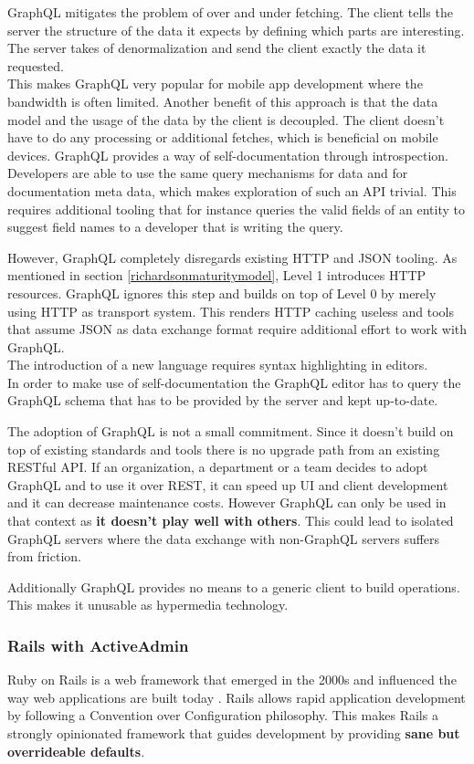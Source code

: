 GraphQL mitigates the problem of over and under fetching. The client tells the server the structure of the data it expects by defining which parts are interesting. The server takes of denormalization and send the client exactly the data it requested. \\ This makes GraphQL very popular for mobile app development where the bandwidth is often limited. Another benefit of this approach is that the data model and the usage of the data by the client is decoupled. The client doesn't have to do any processing or additional fetches, which is beneficial on mobile devices.
GraphQL provides a way of self-documentation through introspection. Developers are able to use the same query mechanisms for data and for documentation meta data, which makes exploration of such an API trivial. This requires additional tooling that for instance queries the valid fields of an entity to suggest field names to a developer that is writing the query.

However, GraphQL completely disregards existing HTTP and JSON tooling. As mentioned in section \ref{richardsonmaturitymodel}, Level 1 introduces HTTP resources. GraphQL ignores this step and builds on top of Level 0 by merely using HTTP as transport system. This renders HTTP caching useless and tools that assume JSON as data exchange format require additional effort to work with GraphQL. \\ The introduction of a new language requires syntax highlighting in editors. \\ In order to make use of self-documentation the GraphQL editor has to query the GraphQL schema that has to be provided by the server and kept up-to-date.

The adoption of GraphQL is not a small commitment. Since it doesn't build on top of existing standards and tools there is no upgrade path from an existing RESTful API. If an organization, a department or a team decides to adopt GraphQL and to use it over REST, it can speed up UI and client development and it can decrease maintenance costs. However GraphQL can only be used in that context as \textbf{it doesn't play well with others}. This could lead to isolated GraphQL servers where the data exchange with non-GraphQL servers suffers from friction.

Additionally GraphQL provides no means to a generic client to build operations. This makes it unusable as hypermedia technology.

\subsubsection{Rails with ActiveAdmin}
Ruby on Rails is a web framework that emerged in the 2000s and influenced the way web applications are built today \citep{rubyonrails}. Rails allows rapid application development by following a Convention over Configuration philosophy. This makes Rails a strongly opinionated framework that guides development by providing \textbf{sane but overrideable defaults}.

